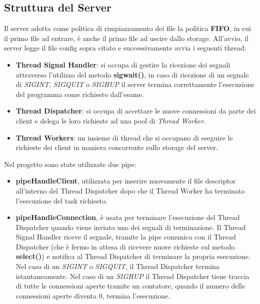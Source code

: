 \documentclass{article}
\begin{document}
\subsection{Struttura del Server}

Il server adotta come politica di rimpiazzamento dei file la politica \textbf{FIFO}, in cui il primo file ad entrare, è anche il primo file ad uscire dallo storage. All'avvio,
il server legge il file config sopra citato e successivamente avvia i seguenti thread:

\begin{itemize}
    \itemsep 0em 
    \item \textbf{Thread Signal Handler}: si occupa di gestire la ricezione dei segnali attraverso l'utilizzo del metodo \textbf{sigwait()}, in caso di ricezione di un segnale di 
    \textit{SIGINT}, \textit{SIGQUIT} o \textit{SIGHUP} il server termina correttamente l'esecuzione del programma come richiesto dall'esame.
    \item \textbf{Thread Dispatcher}: si occupa di accettare le nuove connessioni da parte dei client e delega le loro richieste ad una pool di \textit{Thread Worker}.
    \item \textbf{Thread Workers}: un insieme di thread che si occupano di eseguire le richieste dei client in maniera concorrente sullo storage del server.
\end{itemize}

Nel progetto sono state utilizzate due pipe:
\begin{itemize}
    \itemsep 0em 
    \item \textbf{pipeHandleClient}, utilizzata per inserire nuovamente il file descriptor all'interno del Thread Dispatcher dopo che il Thread Worker ha terminato l'esecuzione del task richiesto.
    \item \textbf{pipeHandleConnection}, è usata per terminare l'esecuzione del Thread Dispatcher quando viene inviato uno dei segnali di terminazione. Il Thread Signal Handler
    riceve il segnale, tramite la pipe comunica con il Thread Dispatcher (che è fermo in attesa di ricevere nuove richieste sul metodo \textbf{select()}) e notifica al Thread Dispatcher di
    terminare la propria esecuzione. Nel caso di un \textit{SIGINT} o \textit{SIGQUIT}, il Thread Dispatcher termina istantaneamente. Nel caso di un \textit{SIGHUP} il Thread Dispatcher tiene traccia di tutte
    le connessioni aperte tramite un contatore, quando il numero delle connessioni aperte diventa 0, termina l'esecuzione.
\end{itemize}
\end{document}
